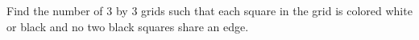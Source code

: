 Find the number of $3$ by $3$ grids such that each square in the grid is colored white or black and no two black squares share an edge.
